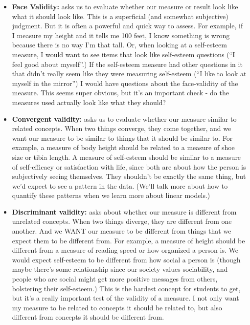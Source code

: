\documentclass[
  letterpaper,
  DIV=11,
  numbers=noendperiod,
  oneside]{scrreprt}
\begin{document}
\begin{itemize}
\item
  \textbf{Face Validity:} asks us to evaluate whether our measure or
  result look like what it should look like. This is a superficial (and
  somewhat subjective) judgment. But it is often a powerful and quick
  way to assess. For example, if I measure my height and it tells me 100
  feet, I know something is wrong because there is no way I'm that tall.
  Or, when looking at a self-esteem measure, I would want to see items
  that look like self-esteem questions (``I feel good about myself''.)
  If the self-esteem measure had other questions in it that didn't
  really seem like they were measuring self-esteem (``I like to look at
  myself in the mirror'') I would have questions about the face-validity
  of the measure. This seems super obvious, but it's an important check
  - do the measures used actually look like what they should?
\item
  \textbf{Convergent validity:} asks us to evaluate whether our measure
  similar to related concepts. When two things converge, they come
  together, and we want our measure to be similar to things that it
  should be similar to. For example, a measure of body height should be
  related to a measure of shoe size or tibia length. A measure of
  self-esteem should be similar to a measure of self-efficacy or
  satisfaction with life, since both are about how the person is
  subjectively seeing themselves. They shouldn't be exactly the same
  thing, but we'd expect to see a pattern in the data. (We'll talk more
  about how to quantify these patterns when we learn more about linear
  models.)
\item
  \textbf{Discriminant validity:} asks about whether our measure is
  different from unrelated concepts. When two things diverge, they are
  different from one another. And we WANT our measure to be different
  from things that we expect them to be different from. For example, a
  measure of height should be different from a measure of reading speed
  or how organized a person is. We would expect self-esteem to be
  different from how social a person is (though maybe there's some
  relationship since our society values sociability, and people who are
  social might get more positive messages from others, bolstering their
  self-esteem.) This is the hardest concept for students to get, but
  it's a really important test of the validity of a measure. I not only
  want my measure to be related to concepts it should be related to, but
  also different from concepts it should be different from.
\end{itemize}
\end{document}
